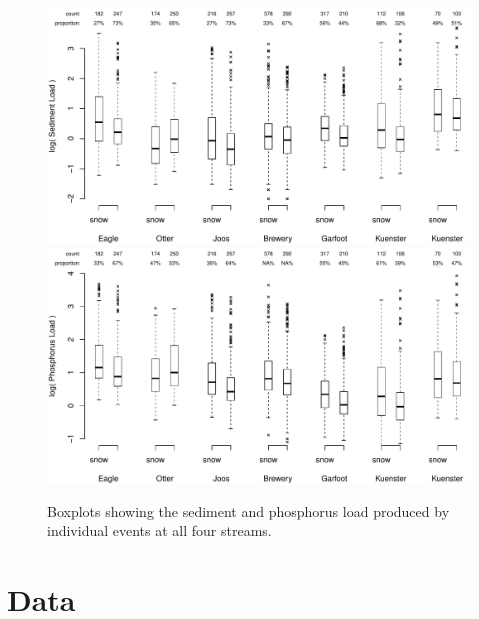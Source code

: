 \documentclass[12pt]{article}
\begin{document}
\begin{figure}[h]
    \begin{center}
\includegraphics{loadings-boxplot_stot}
    \vspace{15mm}
\includegraphics{loadings-boxplot_ptot}
    \caption{Boxplots showing the sediment and phosphorus load produced by individual events at all four streams.\label{boxplots}}
    \end{center}
\end{figure}


















\section{Data}
\end{document}
